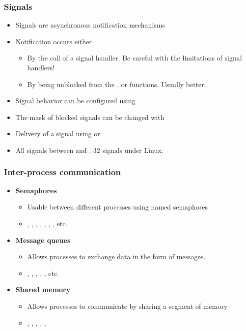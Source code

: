 \begin{frame}
  \frametitle{Signals}
  \begin{itemize}
  \item Signals are asynchronous notification mechanisms
  \item Notification occurs either
    \begin{itemize}
    \item By the call of a signal handler. Be careful with the limitations of signal
      handlers!
    \item By being unblocked from the ,
       or  functions. Usually
      better.
    \end{itemize}
  \item Signal behavior can be configured using 
  \item The mask of blocked signals can be changed with
  \item Delivery of a signal using  or
  \item All signals between  and , 32
    signals under Linux.
  \end{itemize}
\end{frame}

\begin{frame}
  \frametitle{Inter-process communication}
  \begin{itemize}
  \item {\bf Semaphores}
    \begin{itemize}
    \item Usable between different processes using named semaphores
    \item {}, , ,
      , , ,
      , etc.
    \end{itemize}
  \item {\bf Message queues}
    \begin{itemize}
    \item Allows processes to exchange data in the form of messages.
    \item {}, , ,
      , , etc.
    \end{itemize}
  \item {\bf Shared memory}
    \begin{itemize}
    \item Allows processes to communicate by sharing a segment of
      memory
    \item {}, , ,
      , , 
    \end{itemize}
  \end{itemize}
\end{frame}


